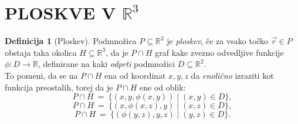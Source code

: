 \documentclass[11pt]{article}
\theoremstyle{definition}
\newtheorem{definicija}{Definicija}[section]
\theoremstyle{definition}
\theoremstyle{definition}
\begin{document}
\pagebreak


\section{PLOSKVE V $\mathbb{R}^3$}
\vspace{0.5cm}


\begin{definicija}[Ploskev]

Podmnožica $P \subseteq \mathbb{R}^3$ je \textit{ploskev}, če za vsako točko $\vec{r} \in P$ obstaja taka okolica $H \subseteq \mathbb{R}^3$, da je $P \cap H$ graf kake zvezno odvedljive funkcije $\phi: D \rightarrow \mathbb{R}$, definirane na kaki \textit{odprti} podmnožici $D \subseteq \mathbb{R}^2$. \\
To pomeni, da se na $P \cap H$ ena od koordinat $x, y, z$ da \textit{enolično} izraziti kot funkcija preostalih, torej da je $P \cap H$ ene od oblik:
$$P \cap H ~=~ \{(x, y, \phi(x, y)) \mid (x, y) \in D\},$$
$$P \cap H ~=~ \{(x, \phi(x, z), y) \mid (x, z) \in D\},$$
$$P \cap H ~=~ \{(\phi(y, z), y, z) \mid (y, z) \in D\}.$$

\end{definicija}
\vspace{0.5cm}
\end{document}
